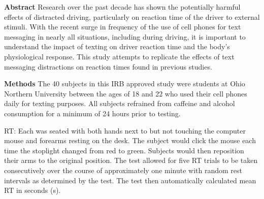 \begin{list}{}{}
  \begin{list}{}{}
  \item [\bf Abstract]
    Research over the past decade has shown the potentially harmful
    effects of distracted driving, particularly on reaction time of
    the driver to external stimuli. With the recent surge in frequency
    of the use of cell phones for text messaging in nearly all
    situations, including during driving, it is important to
    understand the impact of texting on driver reaction time and the
    body’s physiological response. This study attempts to replicate
    the effects of text messaging distractions on reaction times found
    in previous studies.
  \item [\bf Methods]
    The 40 subjects in this IRB approved study were students at Ohio
    Northern University between the ages of 18 and 22 who used their
    cell phones daily for texting purposes. All subjects refrained
    from caffeine and alcohol consumption for a minimum of 24 hours
    prior to testing.

    RT: Each was seated with both hands next to but not touching the
    computer mouse and forearms resting on the desk. The subject would
    click the mouse each time the stoplight changed from red to
    green. Subjects would then reposition their arms to the original
    position. The test allowed for five RT trials to be taken
    consecutively over the course of approximately one minute with
    random rest intervals as determined by the test.  The test then
    automatically calculated mean RT in seconds (s).


\end{list}
\end{list}
